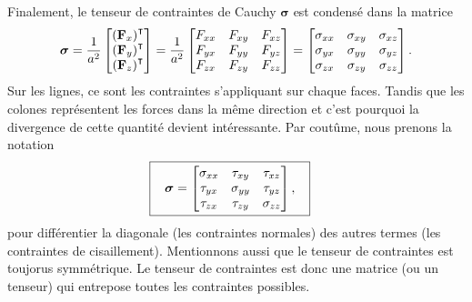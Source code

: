 \documentclass[10pt]{article}
\numberwithin{equation}{section}
\begin{document}
Finalement, le tenseur de contraintes de Cauchy \(\boldsymbol{\sigma}\) est condensé dans la matrice
\begin{equation}
   \boldsymbol{\sigma} = \frac{1}{a^2}
   \begin{bmatrix}
     \qty(\vb{F}_x)^\intercal\\
     \qty(\vb{F}_y)^\intercal\\
     \qty(\vb{F}_z)^\intercal\\
   \end{bmatrix}
   =
   \frac{1}{a^2}
   \begin{bmatrix}
     F_{xx} & F_{xy} & F_{xz} \\
     F_{yx} & F_{yy} & F_{yz} \\
     F_{zx} & F_{zy} & F_{zz} \\
   \end{bmatrix}
   =
   \begin{bmatrix}
     \sigma_{xx} & \sigma_{xy} & \sigma_{xz} \\
     \sigma_{yx} & \sigma_{yy} & \sigma_{yz} \\
     \sigma_{zx} & \sigma_{zy} & \sigma_{zz} \\
   \end{bmatrix}.
\end{equation}
Sur les lignes, ce sont les contraintes s'appliquant sur chaque faces.
Tandis que les colones représentent les forces dans la même direction et c'est pourquoi la divergence de cette quantité devient intéressante. 
Par coutûme, nous prenons la notation
\begin{align}
\label{eq:orgf53bd70}
   &\boxed{\hspace{0.3cm}\boldsymbol{\sigma} =
   \begin{bmatrix}
     \sigma_{xx} & \tau_{xy} & \tau_{xz} \\
     \tau_{yx} & \sigma_{yy} & \tau_{yz} \\
     \tau_{zx} & \tau_{zy} & \sigma_{zz} \\
   \end{bmatrix},\hspace{0.3cm}}
\end{align}
pour différentier la diagonale (les contraintes normales) des autres termes (les contraintes de cisaillement).
Mentionnons aussi que le tenseur de contraintes est toujorus symmétrique.
Le tenseur de contraintes est donc une matrice (ou un tenseur) qui entrepose toutes les contraintes possibles. \bigskip
\end{document}
